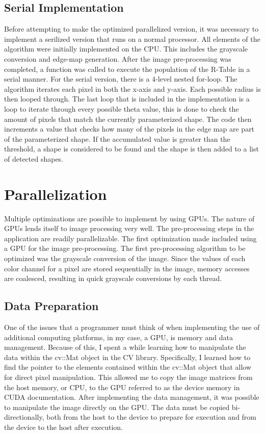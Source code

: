 \documentclass[conference]{IEEEtran}
\begin{document}
\subsection{Serial Implementation}
Before attempting to make the optimized parallelized version, it was necessary to implement a serilized version that runs on a normal processor. 
All elements of the algorithm were initially implemented on the CPU\@. This includes the grayscale conversion and edge-map generation. 
After the image pre-processing was completed, a function was called to execute the population of the R-Table in a serial manner. 
For the serial version, there is a 4-level nested for-loop. The algorithm iterates each pixel in both the x-axis and y-axis. Each possible radius is then looped through. The last loop that is included in the implementation is a loop to iterate through every possible theta value, this is done to check the amount of pixels that match the currently parameterized shape. 
The code then increments a value that checks how many of the pixels in the edge map are part of the parameterized shape. 
If the accumulated value is greater than the threshold, a shape is considered to be found and the shape is then added to a list of detected shapes. 


\section{Parallelization}
Multiple optimizations are possible to implement by using GPUs. 
The nature of GPUs lends itself to image processing very well. 
The pre-processing steps in the application are readily parallelizable. 
The first optimization made included using a GPU for the image pre-processing. 
The first pre-processing algorithm to be optimized was the grayscale conversion of the image. 
Since the values of each color channel for a pixel are stored sequentially in the image, memory accesses are coalesced, resulting in quick grayscale conversions by each thread. 


\subsection{Data Preparation}
One of the issues that a programmer must think of when implementing the use of additional computing platforms, in my case, a GPU, is memory and data management. 
Because of this, I spent a while learning how to manipulate the data within the cv::Mat object in the CV library. 
Specifically, I learned how to find the pointer to the elements contained within the cv::Mat object that allow for direct pixel manipulation. This allowed me to copy the image matrices from the host memory, or CPU, to the GPU referred to as the device memory in CUDA documentation. 
After implementing the data management, it was possible to manipulate the image directly on the GPU\@. 
The data must be copied bi-directionally, both from the host to the device to prepare for execution and from the device to the host after execution.  
\end{document}
